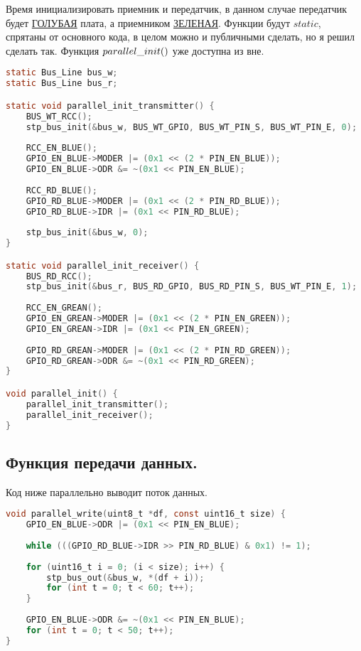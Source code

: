 \documentclass{bmstu}
\begin{document}
	Время инициализировать приемник и передатчик, в данном случае передатчик будет \underline{ГОЛУБАЯ} плата, а приемником \underline{ЗЕЛЕНАЯ}. 
	Функции будут $static$, спрятаны от основного кода, в целом можно и публичными сделать, но я решил сделать так. Функция $parallel\text{\textunderscore}init()$ уже доступна из вне.
	
	\begingroup
	\fontsize{12pt}{12pt}\selectfont
	\begin{lstlisting}[language=C]
static Bus_Line bus_w;
static Bus_Line bus_r;

static void parallel_init_transmitter() {
	BUS_WT_RCC();
	stp_bus_init(&bus_w, BUS_WT_GPIO, BUS_WT_PIN_S, BUS_WT_PIN_E, 0);
	
	RCC_EN_BLUE();
	GPIO_EN_BLUE->MODER |= (0x1 << (2 * PIN_EN_BLUE));
	GPIO_EN_BLUE->ODR &= ~(0x1 << PIN_EN_BLUE);
	
	RCC_RD_BLUE();
	GPIO_RD_BLUE->MODER |= (0x1 << (2 * PIN_RD_BLUE));
	GPIO_RD_BLUE->IDR |= (0x1 << PIN_RD_BLUE);
	
	stp_bus_init(&bus_w, 0);
}

static void parallel_init_receiver() {
	BUS_RD_RCC();
	stp_bus_init(&bus_r, BUS_RD_GPIO, BUS_RD_PIN_S, BUS_WT_PIN_E, 1);
	
	RCC_EN_GREAN();
	GPIO_EN_GREAN->MODER |= (0x1 << (2 * PIN_EN_GREEN));
	GPIO_EN_GREAN->IDR |= (0x1 << PIN_EN_GREEN);
	
	GPIO_RD_GREAN->MODER |= (0x1 << (2 * PIN_RD_GREEN));
	GPIO_RD_GREAN->ODR &= ~(0x1 << PIN_RD_GREEN);
}

void parallel_init() {
	parallel_init_transmitter();
	parallel_init_receiver();
}
	\end{lstlisting}
	\endgroup
	
	\subsection{Функция передачи данных.}
	
	Код ниже параллельно выводит поток данных.
	
	\begingroup
	\fontsize{12pt}{12pt}\selectfont
	\begin{lstlisting}[language=C]
void parallel_write(uint8_t *df, const uint16_t size) {
	GPIO_EN_BLUE->ODR |= (0x1 << PIN_EN_BLUE);
	
	while (((GPIO_RD_BLUE->IDR >> PIN_RD_BLUE) & 0x1) != 1);
	
	for (uint16_t i = 0; (i < size); i++) {
		stp_bus_out(&bus_w, *(df + i));
		for (int t = 0; t < 60; t++);
	}
	
	GPIO_EN_BLUE->ODR &= ~(0x1 << PIN_EN_BLUE);
	for (int t = 0; t < 50; t++);
}		
	\end{lstlisting}
	\endgroup
	
\end{document}
